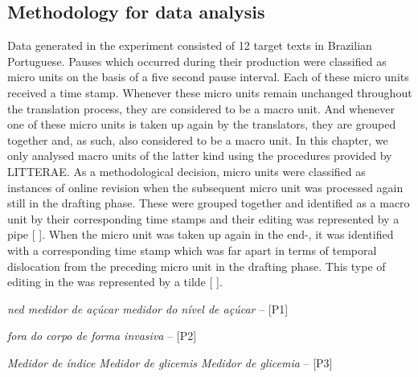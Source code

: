 \documentclass[output=paper]{LSP/langsci}
\begin{document}
\subsection{Methodology for data analysis}\label{sec:alves:3.2}

Data generated in the experiment consisted of 12 target texts in Brazilian Portuguese. Pauses which occurred during their production were classified as micro units on the basis of a five second pause interval. Each of these micro units received a time stamp. Whenever these micro units remain unchanged throughout the translation process, they are considered to be a macro unit. And whenever one of these micro units is taken up again by the translators, they are grouped together and, as such, also considered to be a macro unit. In this chapter, we only analysed macro units of the latter kind using the  procedures provided by LITTERAE. As a methodological decision, micro units were classified as instances of online revision when the subsequent micro unit was processed again still in the drafting phase. These were grouped together and identified as a macro unit by their corresponding time stamps and their editing was represented by a pipe [ {\textbar} ]. When the micro unit was taken up again in the end-, it was identified with a corresponding time stamp which was far apart in terms of temporal dislocation from the preceding micro unit in the drafting phase. This type of editing in the  was represented by a tilde [ {\Tilde} ]. 

\ea \label{ex:alves:1}
\textit{ned {\textbar} medidor de açúcar {\textbar} medidor do nível de açúcar }-- [P1]
\z

\ea \label{ex:alves:2}
\textit{fora do corpo {\Tilde} de forma invasiva }-- [P2]
\z

\ea \label{ex:alves:3}
\textit{Medidor de índice {\textbar} Medidor de glicemis {\Tilde} Medidor de glicemia }-- [P3]
\z
\end{document}
